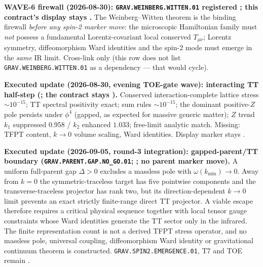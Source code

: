 \par\smallskip\noindent\textbf{WAVE-6 firewall (2026-08-30): \texttt{GRAV.WEINBERG.WITTEN.01}
registered \mO; this contract's display stays \mO.}
The Weinberg--Witten theorem is the binding firewall \emph{before any spin-2 marker move}:
the microscopic Hamiltonian family must \emph{not} possess a fundamental Lorentz-covariant
local conserved $T_{\mu\nu}$; Lorentz symmetry, diffeomorphism Ward identities and the
spin-2 mode must emerge in the \emph{same} IR limit.  Cross-link only (this row does not
list \texttt{GRAV.WEINBERG.WITTEN.01} as a dependency --- that would cycle).

\par\smallskip\noindent\textbf{Executed update (2026-08-30, evening TOE-gate wave): interacting
TT half-step
(; the contract stays \mO).}
Conserved interaction-complete lattice stress $\sim10^{-15}$; TT spectral positivity exact;
sum rules $\sim10^{-15}$; the dominant positive-$Z$ pole persists under $\phi^4$ (gapped, as
expected for massive generic matter); $Z$ trend $k_1$ suppressed $0.958$ / $k_2$ enhanced $1.033$;
free-limit analytic match.  Missing: TFPT content, $k\to0$ volume scaling, Ward identities.
Display marker stays \mO.

\par\smallskip\noindent\textbf{Executed update (2026-09-05, round-3 integration):
gapped-parent/TT boundary
(\texttt{GRAV.PARENT.GAP.NO\_GO.01};
; no parent
marker move).}
A uniform full-parent gap $\Delta>0$ excludes a massless pole with
$\omega(k_{\min})\to0$.  Away from $k=0$ the symmetric-traceless target has five
pointwise components and the transverse-traceless projector has rank two, but its
direction-dependent $k\to0$ limit prevents an exact strictly finite-range direct TT
projector.  A viable escape therefore requires a critical physical sequence together
with local tensor gauge constraints whose Ward identities generate the TT sector only
in the infrared.  The finite representation count is not a derived TFPT stress
operator, and no massless pole, universal coupling, diffeomorphism Ward identity or
gravitational continuum theorem is constructed.  \texttt{GRAV.SPIN2.EMERGENCE.01},
T7 and TOE remain \mO.

